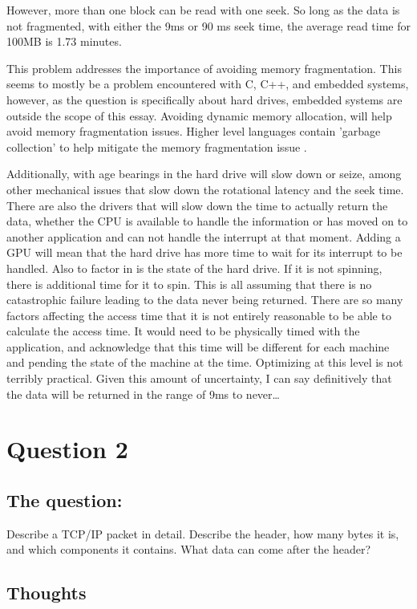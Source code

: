 \documentclass[a4paper]{article}
\begin{document}
	However, more than one block can be read with one seek.  So long as the data is not fragmented, with either the 9ms or 90 ms seek time, the average read time for 100MB is 1.73 minutes.
    
    This problem addresses the importance of avoiding memory fragmentation.  This seems to mostly be a problem encountered with C, C++, and embedded systems, however, as the question is specifically about hard drives, embedded systems are outside the scope of this essay.  Avoiding dynamic memory allocation, will help avoid memory fragmentation issues.  Higher level languages contain 'garbage collection' to help mitigate the memory fragmentation issue \cite{malloc}.

	Additionally, with age bearings in the hard drive will slow down or seize, among other mechanical issues that slow down the rotational latency and the seek time.  There are also the drivers that will slow down the time to actually return the data, whether the CPU is available to handle the information or has moved on to another application and can not handle the interrupt at that moment.  Adding a GPU will mean that the hard drive has more time to wait for its interrupt to be handled.  Also to factor in is the state of the hard drive.  If it is not spinning, there is additional time for it to spin.  This is all assuming that there is no catastrophic failure leading to the data never being returned.  There are so many factors affecting the access time that it is not entirely reasonable to be able to calculate the access time.  It would need to be physically timed with the application, and acknowledge that this time will be different for each machine and pending the state of the machine at the time.  Optimizing at this level is not terribly practical.  Given this amount of uncertainty, I can say definitively that the data will be returned in the range of 9ms to never\dots
\section{Question 2}
\label{sec:question 2}

\subsection{The question:}
Describe a TCP/IP packet in detail. Describe the header, how many bytes it is, and which components it contains. What data can come after the header?

\subsection{Thoughts}
\end{document}
